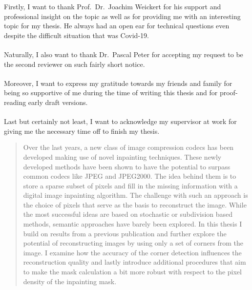 \documentclass[
12pt, %
oneside, %
english, %
onehalfspacing, %
toctotoc, %
headsepline, %
chapterinoneline, %
]{MastersDoctoralThesis} %
\begin{document}



\cleardoublepage

\begin{acknowledgements}
    \addchaptertocentry{\acknowledgementname}
    Firstly, I want to thank Prof.\ Dr.\ Joachim Weickert for his support and professional insight
    on the topic as well as for providing me with an interesting topic for my thesis. He always
    had an open ear for technical questions even despite the difficult situation that was
    Covid-19.\\
\\
    \noindent Naturally, I also want to thank Dr.\ Pascal Peter for accepting my
    request to be the second reviewer on such fairly short notice.\\
\\
    \noindent Moreover, I want to express my gratitude towards my friends and family for being 
    so supportive of me during the time of writing this thesis and for proof-reading early
    draft versions.\\
\\
    \noindent Last but certainly not least, I want to acknowledge my supervisor at work for 
    giving me the necessary time off to finish my thesis.
\end{acknowledgements}


\begin{abstract}
    \addchaptertocentry{\abstractname} 
    Over the last years, a new class of image compression codecs has been developed making use of
    novel inpainting techniques. These newly developed methods have been shown to have the
    potential to surpass common codecs like JPEG and JPEG2000. The idea behind them is to store a
    sparse subset of pixels and fill in the missing information with a digital image inpainting 
    algorithm. The challenge with such an approach is the choice of pixels that serve as the basis 
    to reconstruct the image. While the most successful ideas are based on stochastic or
    subdivision based methods, semantic approaches have barely been explored.
    In this thesis I build on results from a previous publication and further explore the potential 
    of reconstructing images by using only a set of corners from the image. I examine how 
    the accuracy of the corner detection influences the reconstruction quality and lastly introduce 
    additional procedures that aim to make the mask calculation a bit more robust with respect to
    the pixel density of the inpainting mask.
\end{abstract}
\end{document}
